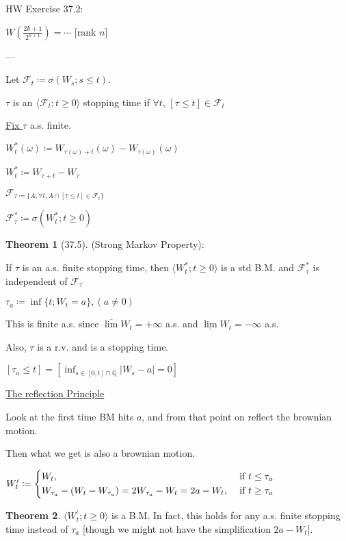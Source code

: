 \documentclass{article}
\theoremstyle{definition}
\newtheorem{theorem}{Theorem}
\begin{document}
HW Exercise 37.2:

\(W\left( \frac{2k+1}{2^{n+1}} \right) = \cdots \) [rank \(n\)]

---

Let \(\mathscr{F}_t \coloneqq \sigma(W_s ; s \leq t)\).

\(\tau\) is an \(\langle \mathscr{F}_t ; t \geq 0 \rangle \)  stopping time if \(\forall t\), \([\tau \leq t] \in \mathscr{F}_t\)

\underline{Fix \(\tau\)} a.s. finite.

\(W_t ^{\ast} (\omega) \coloneqq W_{\tau(\omega) + t}(\omega) - W_{\tau(\omega)}(\omega)\)

\(W_t^{\ast} \coloneqq W_{\tau + t} - W_{\tau} \) 

\(\mathscr{F}_{\tau \coloneqq \{ A ; \forall t, A\cap [\tau \leq t]\in \mathscr{F}_t \} } \) 

\(\mathscr{F} ^{\ast} _\tau \coloneqq \sigma(W_t^{\ast} ; t\geq 0)\)

\begin{theorem}
    [37.5] (Strong Markov Property):

    If \(\tau\) is an a.s. finite stopping time, then \(\langle W_t^{\ast} ; t\geq 0\rangle \) is a std B.M. and \(\mathscr{F}^{\ast}_{\tau} \) is independent of \(\mathscr{F}_{\tau} \) 
\end{theorem}
\(\tau_a \coloneqq \inf \{ t ; W_t = a \}, (a\neq 0)\)

This is finite a.s. since \(\overline{\lim} W_t = +\infty \) a.s. and \(\underline{\lim} W_t = -\infty\) a.s.

Also, \(\tau\) is a r.v. and is a stopping time.

\([\tau_a \leq t] = [\inf_{s \in [0,t]\cap\mathbb{Q}} \vert W_s - a \vert = 0]\) 

\underline{The reflection Principle} 

Look at the first time BM hits \(a\), and from that point on reflect the brownian motion.

Then what we get is also a brownian motion.

\(W_t^{\prime} \coloneqq \begin{dcases}
    W_t, &\text{ if } t \leq \tau_a\\
    W_{\tau_a} - (W_t - W_{\tau_a}) = 2 W_{\tau _a} - W_t = 2a - W_t, &\text{ if } t \geq \tau_a
\end{dcases}\) 

\begin{theorem}
    \(\langle W_t^{\prime} ; t \geq 0 \rangle \) is a B.M. In fact, this holds for any a.s. finite stopping time instead of \(\tau_a\) [though we might not have the simplification \(2a - W_t\)].
\end{theorem}
\end{document}
